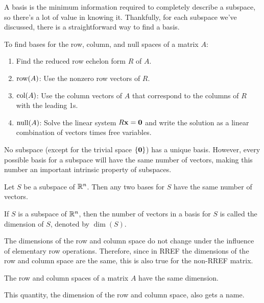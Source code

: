 \documentclass[../m073main.tex]{subfiles}
\begin{document}
A basis is the minimum information required to completely describe a subspace, so there's a lot of value in knowing it.
Thankfully, for each subspace we've discussed, there is a straightforward way to find a basis.

\begin{definition}
	To find bases for the row, column, and null spaces of a matrix $A$:
	\begin{enumerate}
		\item Find the reduced row echelon form $R$ of $A$.
		\item $\textrm{row}(A)$: Use the nonzero row vectors of $R$.
		\item $\textrm{col}(A)$: Use the column vectors of $A$ that correspond to the columns of $R$ with the leading 1s.
		\item $\textrm{null}(A)$: Solve the linear system $R\mathbf{x} = \mathbf{0}$ and write the solution as a linear combination of vectors times free variables.
	\end{enumerate}
\end{definition}

No subspace (except for the trivial space $\{ \mathbf{0} \}$) has a unique basis.
However, every possible basis for a subspace will have the same number of vectors, making this number an important intrinsic property of subspaces.

\begin{theorem}
	Let $S$ be a subspace of $\mathbb{R}^n$.
	Then any two bases for $S$ have the same number of vectors.
\end{theorem}

\begin{definition}[Dimension]
	If $S$ is a subspace of $\mathbb{R}^n$, then the number of vectors in a basis for $S$ is called the dimension of $S$, denoted by $\dim(S)$.
\end{definition}

The dimensions of the row and column space do not change under the influence of elementary row operations.
Therefore, since in RREF the dimensions of the row and column space are the same, this is also true for the non-RREF matrix.

\begin{theorem}
	The row and column spaces of a matrix $A$ have the same dimension.
\end{theorem}

This quantity, the dimension of the row and column space, also gets a name.
\end{document}
